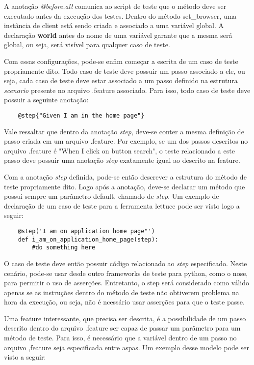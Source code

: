     A anotação \textit{@before.all} comunica ao script de teste que o método
    deve ser executado antes da execução dos testes. Dentro do método
    set\_browser, uma instância de client está sendo criada e associado a uma
    variável global. A declaração \textbf{world} antes do nome de uma variável
    garante que a mesma será global, ou seja, será visível para qualquer caso de
    teste.

    Com essas configurações, pode-se enfim começar a escrita de um caso de teste
    propriamente dito. Todo caso de teste deve possuir um passo associado a ele,
    ou seja, cada caso de teste deve estar associado a um passo definido na
    estrutura \textit{scenario} presente no arquivo .feature associado. Para
    isso, todo caso de teste deve possuir a seguinte anotação:

    \begin{verbatim}
    @step{"Given I am in the home page"}
    \end{verbatim}

    Vale ressaltar que dentro da anotação \textit{step}, deve-se conter a mesma
    definição de passo criada em um arquivo .feature. Por exemplo, se um dos
    passos descritos no arquivo .feature é "When I click on button search", o
    teste relacionado a este passo deve possuir uma anotação \textit{step}
    exatamente igual ao descrito na feature.

    Com a anotação \textit{step} definida, pode-se então descrever a estrutura
    do método de teste propriamente dito. Logo após a anotação, deve-se declarar
    um método que possui sempre um parâmetro default, chamado de \textit{step}.
    Um exemplo de declaração de um caso de teste para a ferramenta lettuce pode
    ser visto logo a seguir:

    \begin{verbatim}
    @step('I am on application home page"')
    def i_am_on_application_home_page(step):
        #do something here
    \end{verbatim}

    O caso de teste deve então possuir código relacionado ao \textit{step}
    especificado. Neste cenário, pode-se usar desde outro frameworks de teste
    para python, como o nose, para permitir o uso de asserções. Entretanto,
    o step será considerado como válido apenas se as instruções dentro do
    método de teste não obtiverem problema na hora da execução, ou seja, não é
    ncessário usar asserções para que o teste passe.

    Uma feature interessante, que precisa ser descrita, é a possibilidade de um
    passo descrito dentro do arquivo .feature ser capaz de passar um parâmetro
    para um método de teste. Para isso, é necessário que a variável dentro de um
    passo no arquivo ,feature seja especificada entre aspas. Um exemplo desse
    modelo pode ser visto a seguir:

